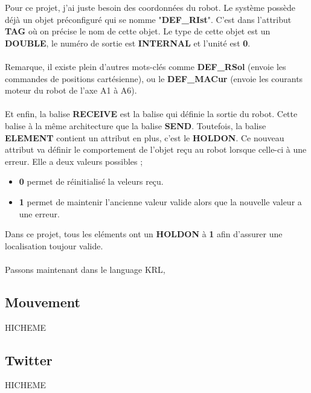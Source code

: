 Pour ce projet, j'ai juste besoin des coordonnées du robot.
Le système possède déjà un objet préconfiguré qui se nomme "\textbf{DEF\_RIst}".
C'est dans l'attribut \textbf{TAG} où on précise le nom de cette objet.
Le type de cette objet est un \textbf{DOUBLE}, le numéro de sortie est \textbf{INTERNAL} et l'unité est \textbf{0}.
\\
\\
Remarque, il existe plein d'autres mots-clés comme \textbf{DEF\_RSol} (envoie les commandes de positions cartésienne), ou le \textbf{DEF\_MACur} (envoie les courants moteur du robot de l'axe A1 à A6).
\\
\\
Et enfin, la balise \textbf{RECEIVE} est la balise qui définie la sortie du robot.
Cette balise à la même architecture que la balise \textbf{SEND}.
Toutefois, la balise \textbf{ELEMENT} contient un attribut en plus, c'est le \textbf{HOLDON}.
Ce nouveau attribut va définir le comportement de l'objet reçu au robot lorsque celle-ci à une erreur.
Elle a deux valeurs possibles ;
\begin{itemize}
    \item \textbf{0} permet de réinitialisé la veleurs reçu.
    \item \textbf{1} permet de maintenir l'ancienne valeur valide alors que la nouvelle valeur a une erreur.
\end{itemize}
Dans ce projet, tous les eléments ont un \textbf{HOLDON} à \textbf{1} afin d'assurer une localisation toujour valide.
\\
\\
Passons maintenant dans le language KRL,

\subsection{Mouvement}

HICHEME

\subsection{Twitter}

HICHEME

